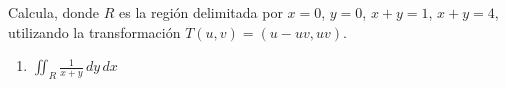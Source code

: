 Calcula, donde \( R \) es la región delimitada por \( x = 0 \), \( y = 0 \), \( x + y = 1 \), \( x + y = 4 \), utilizando la transformación \( T(u, v) = (u - uv, uv) \).

\begin{enumerate}[label=(\alph*), itemsep=0.4em, topsep=0.5em]
	\item $\displaystyle \iint_R \frac{1}{x + y} \, dy \, dx$
\end{enumerate}
